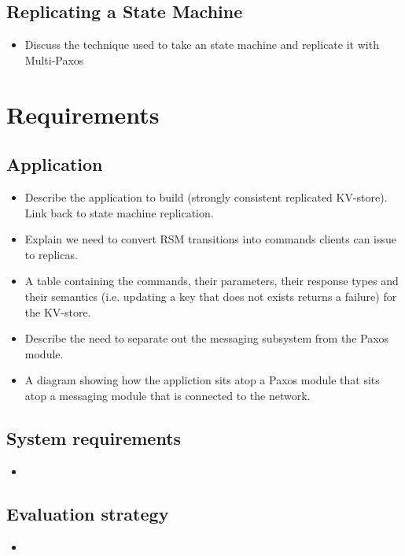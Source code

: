\documentclass[12pt,twoside,notitlepage]{report}
\begin{document}
\subsection{Replicating a State Machine}
\begin{itemize}
  \item Discuss the technique used to take an state machine and replicate it with Multi-Paxos
\end{itemize}

\section{Requirements}

\subsection{Application}
\begin{itemize}
  \item Describe the application to build (strongly consistent replicated KV-store). Link back to state machine replication.
  \item Explain we need to convert RSM transitions into commands clients can issue to replicas.
  \item A table containing the commands, their parameters, their response types and their semantics (i.e. updating a key that does not exists returns a failure) for the KV-store.
  \item Describe the need to separate out the messaging subsystem from the Paxos module.
  \item A diagram showing how the appliction sits atop a Paxos module that sits atop a messaging module that is connected to the network.
\end{itemize}

\subsection{System requirements}
\begin{itemize}
  \item
\end{itemize}

\subsection{Evaluation strategy}
\begin{itemize}
  \item
\end{itemize}
\end{document}
